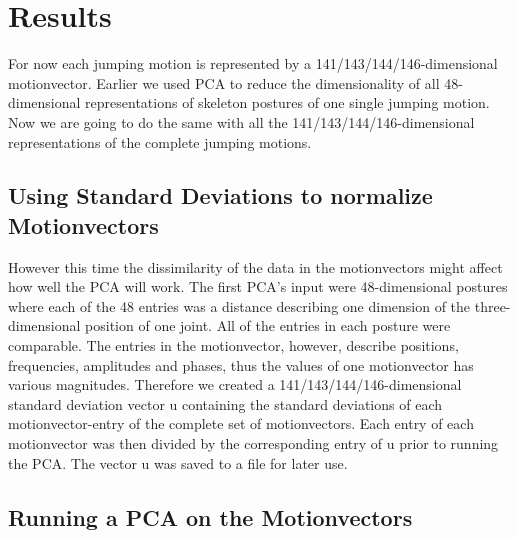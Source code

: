 \documentclass[a4paper]{article}
\begin{document}
\section{Results}

For now each jumping motion is represented by a 141/143/144/146-dimensional motionvector.
Earlier we used PCA to reduce the dimensionality of all 48-dimensional representations of skeleton postures of one single jumping motion.
Now we are going to do the same with all the 141/143/144/146-dimensional representations of the complete jumping motions.

\subsection{Using Standard Deviations to normalize Motionvectors}

However this time the dissimilarity of the data in the motionvectors might affect how well the PCA will work.
The first PCA's input were 48-dimensional postures where each of the 48 entries was a distance describing one dimension of the three-dimensional position of one joint.
All of the entries in each posture were comparable.
The entries in the motionvector, however, describe positions, frequencies, amplitudes and phases, thus the values of one motionvector has various magnitudes.
Therefore we created a 141/143/144/146-dimensional standard deviation vector u containing the standard deviations of each motionvector-entry of the complete set of motionvectors.
Each entry of each motionvector was then divided by the corresponding entry of u prior to running the PCA.
The vector u was saved to a file for later use.

\subsection{Running a PCA on the Motionvectors}
\end{document}
